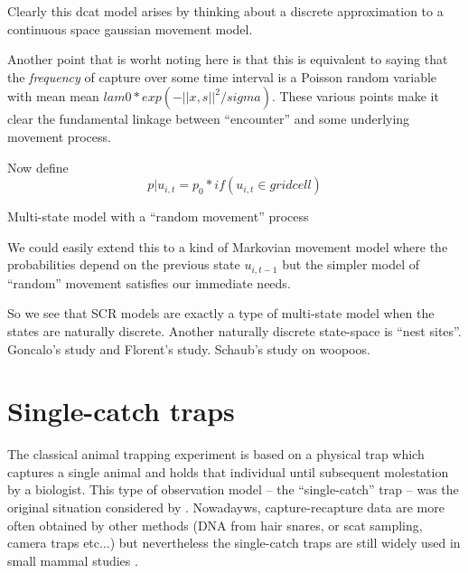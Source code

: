 Clearly this dcat model arises by thinking about a discrete
approximation to a continuous space
gaussian movement model.

Another point that is worht noting here is that this is equivalent to saying
that the {\it frequency} of capture over some time interval is a Poisson
random variable with mean
mean $lam0*exp(-||x,s||^2/sigma)$.  These   various points
make it clear the fundamental linkage between ``encounter'' and some
underlying movement process.


Now define
\[
 p|u_{i,t} = p_{0}*if(u_{i,t} \in grid cell)
\]

Multi-state model with a ``random movement'' process


We could easily extend this to a kind of Markovian movement model
where the probabilities depend on the previous state $u_{i,t-1}$ but
the simpler model of ``random'' movement satisfies our immediate needs.
 
So we see that SCR models are exactly a type of multi-state model when
the states are naturally discrete.  Another naturally discrete
state-space is ``nest sites''. Goncalo’s study and Florent’s
study. Schaub’s study on woopoos.

\section{Single-catch traps}
\label{poisson-mn.sec.singlecatch}

The classical animal trapping experiment is based on a physical trap
which captures a single animal and holds that individual until
subsequent molestation by a biologist. 
This type of observation model -- the ``single-catch'' trap -- 
was the original situation considered by
\citet{efford:2004}. Nowadayws, capture-recapture data are more often
obtained by other methods (DNA from hair snares, or scat sampling,
camera traps etc...) but nevertheless the single-catch traps are still
widely used in small mammal studies \citep{converse_1996,
  converse_royle:2012, converse_royle:2013}.


